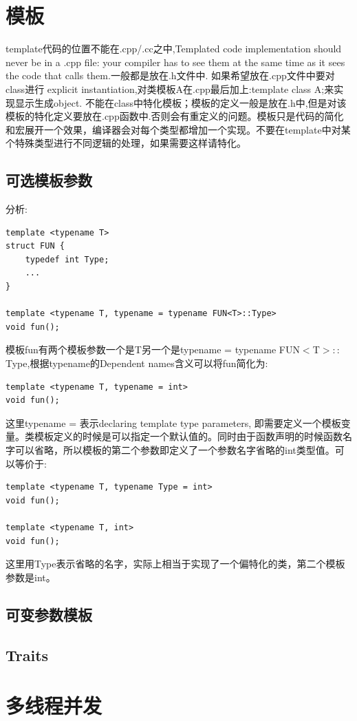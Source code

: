 \documentclass[12pt]{book}
\begin{document}
\section{模板}
template代码的位置不能在.cpp/.cc之中,Templated code implementation should never be in a .cpp file: your compiler has to see them at the same time as it sees the code that calls them.一般都是放在.h文件中. 如果希望放在.cpp文件中要对class进行 explicit instantiation,对类模板A在.cpp最后加上:template class A;来实现显示生成object. 不能在class中特化模板；模板的定义一般是放在.h中,但是对该模板的特化定义要放在.cpp函数中.否则会有重定义的问题。模板只是代码的简化和宏展开一个效果，编译器会对每个类型都增加一个实现。不要在template中对某个特殊类型进行不同逻辑的处理，如果需要这样请特化。

\subsection{可选模板参数}
分析:
\begin{lstlisting}
template <typename T>
struct FUN {
	typedef int Type;
	...
}

template <typename T, typename = typename FUN<T>::Type>
void fun();
\end{lstlisting}
模板fun有两个模板参数一个是T另一个是typename = typename FUN$<$T$>::$Type,根据typename的Dependent names含义可以将fun简化为:
\begin{lstlisting}
template <typename T, typename = int>
void fun();
\end{lstlisting}
这里typename = 表示declaring template type parameters, 即需要定义一个模板变量。类模板定义的时候是可以指定一个默认值的。同时由于函数声明的时候函数名字可以省略，所以模板的第二个参数即定义了一个参数名字省略的int类型值。可以等价于:
\begin{lstlisting}
template <typename T, typename Type = int>
void fun();
	
template <typename T, int>
void fun();
\end{lstlisting}
这里用Type表示省略的名字，实际上相当于实现了一个偏特化的类，第二个模板参数是int。

\subsection{可变参数模板}
\subsection{Traits}

\section{多线程并发}
\end{document}
